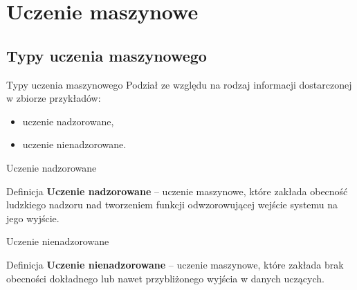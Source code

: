 \documentclass[xcolor=dvipsnames]{beamer}
\begin{document}
\section{Uczenie maszynowe}
\subsection{Typy uczenia maszynowego}
\begin{frame}{Typy uczenia maszynowego}
	Podział ze względu na rodzaj informacji dostarczonej w zbiorze przykładów:
	\begin{itemize}
		\item uczenie nadzorowane,
		\item uczenie nienadzorowane.
	\end{itemize}
\end{frame}
\begin{frame}{Uczenie nadzorowane}
  \begin{block}{Definicja}
  	\textbf{Uczenie nadzorowane} --  uczenie maszynowe, które zakłada obecność ludzkiego nadzoru nad tworzeniem funkcji odwzorowującej wejście systemu na jego wyjście.\\
  	\vspace{5mm}
  	\hspace*{}
  \end{block}
\end{frame}
\begin{frame}{Uczenie nienadzorowane}
	\begin{block}{Definicja}
		 \textbf{Uczenie nienadzorowane} --  uczenie maszynowe, które zakłada brak obecności dokładnego lub nawet przybliżonego wyjścia w danych uczących.\\
		\vspace{5mm}
		\hspace*{}
	\end{block}	
\end{frame}
\end{document}
